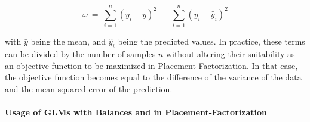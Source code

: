 \begin{equation}
    \label{sec:Factorization:sub:GLM:eq:ObjectiveFunction}
    \omega %
    ~=~ \sum_{i=1}^{n} \left( y_i - \bar{y} \right)^2
    ~-~ \sum_{i=1}^{n} \left( y_i - \hat{y}_i \right)^2
\end{equation}

with $\bar{y}$ being the mean, and $\hat{y}_i$ being the predicted values.
In practice, these terms can be divided by the number of samples $n$
without altering their suitability as an objective function to be maximized in Placement-Factorization.
In that case, the objective function becomes equal to the difference of the variance of the data
and the mean squared error of the prediction.




\paragraph{Usage of GLMs with Balances and in Placement-Factorization}
\label{sec:Factorization:sub:Methods:sub:GLMs:par:Balances}

